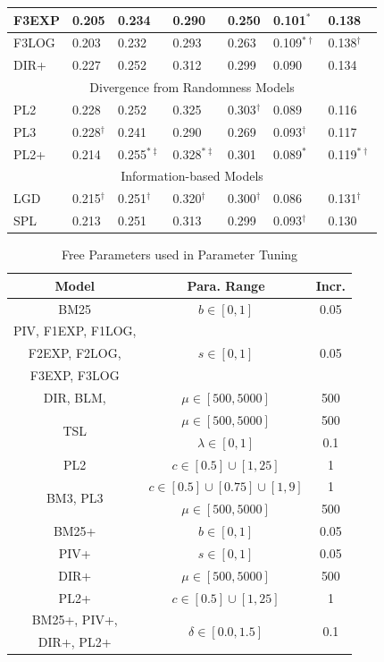 \begin{table}[t]
\begin{tabular}{ |l||l||l||l||l||l||l| }
F3EXP & 0.205 & 0.234 & 0.290 & 0.250 & 0.101$^*$ & 0.138 \\ \hline
F3LOG & 0.203 & 0.232 & 0.293 & 0.263 & 0.109$^{*\dagger}$ & 0.138$^{\dagger}$ \\ \hline
DIR+ & 0.227 & 0.252 & 0.312 & 0.299 & 0.090 & 0.134 \\ \hline
\hline
\multicolumn{7}{|c|}{Divergence from Randomness Models} \\ \hline 
PL2 & 0.228 & 0.252 & 0.325 & 0.303$^{\dagger}$ & 0.089 & 0.116 \\ \hline
PL3 & 0.228$^{\dagger}$ & 0.241 & 0.290 & 0.269 & 0.093$^{\dagger}$ & 0.117 \\ \hline
PL2+ & 0.214 & 0.255$^{*\ddagger}$ & 0.328$^{*\ddagger}$ & 0.301 & 0.089$^*$ & 0.119$^{*\dagger}$ \\ \hline
\hline
\multicolumn{7}{|c|}{Information-based Models} \\ \hline 
LGD & 0.215$^{\dagger}$ & 0.251$^{\dagger}$ & 0.320$^{\dagger}$ & 0.300$^{\dagger}$ & 0.086 & 0.131$^{\dagger}$ \\ \hline
SPL & 0.213 & 0.251 & 0.313 & 0.299 & 0.093$^{\dagger}$ & 0.130 \\ \hline
\end{tabular}
\end{table}

\begin{table}[t]
\centering
\caption{Free Parameters used in Parameter Tuning}
\label{tab:free_paras}
\begin{tabular}{ |c|c|c| } \hline
\textbf{Model} & \textbf{Para. Range} & \textbf{Incr.} \\\hline
BM25 & $b \in {[0,1]}$ & 0.05 \\ \hline
PIV, F1EXP, F1LOG, & \multirow{3}{*}{$s \in {[0,1]}$} & \multirow{3}{*}{0.05}\\
F2EXP, F2LOG, &  & \\
F3EXP, F3LOG &  & \\ \hline
DIR, BLM, & $\mu \in {[500,5000]}$ & 500 \\ \hline
\multirow{2}{*}{TSL} & $\mu \in {[500,5000]}$ & 500 \\
& $\lambda \in {[0,1]}$ & 0.1 \\ \hline
PL2 & $c \in {[0.5]\cup[1,25]}$ & 1 \\ \hline
\multirow{2}{*}{BM3, PL3} & $c \in {[0.5]\cup[0.75]\cup[1,9]}$ & 1 \\ 
& $\mu \in {[500,5000]}$ & 500 \\ \hline
BM25+ & $b \in {[0,1]}$ & 0.05 \\ \hline
PIV+ & $s \in {[0,1]}$ & 0.05 \\ \hline
DIR+ & $\mu \in {[500,5000]}$ & 500 \\ \hline
PL2+ & $c \in {[0.5]\cup[1,25]}$ & 1 \\ \hline
BM25+, PIV+, & \multirow{2}{*}{$\delta \in {[0.0,1.5]}$} & \multirow{2}{*}{0.1} \\
DIR+, PL2+ & & \\ \hline
\end{tabular}
\end{table}

